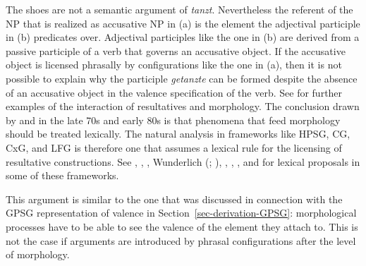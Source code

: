 \zl
The shoes are not a semantic argument of \emph{tanzt}. Nevertheless the referent of the NP that is realized as
accusative NP in (a) is the element the adjectival participle in (b) predicates
over. Adjectival participles like the one in (b) are derived from a passive participle of a
verb that governs an accusative object. If the accusative object is licensed phrasally by
configurations like the one in (a), then it is not possible to explain why the participle \emph{getanzte}
can be formed despite the absence of an accusative object in the valence specification of the verb. See  for
further examples of the interaction of resultatives and morphology.
The conclusion drawn by \citet[]{Dowty78a}
and \citet[]{Bresnan82a} in the late 70s and early 80s is that phenomena that feed morphology should be treated
lexically. The natural analysis in frameworks like HPSG, CG, CxG, and LFG is therefore one that assumes
a lexical rule for the licensing of resultative constructions. See
, , , Wunderlich (\citeyear[]{Wunderlich92a-u-kopiert}; \citeyear[--126]{Wunderlich97c}), ,
 , , and  for lexical proposals in some of
 these frameworks. 

This argument is similar to the one that was discussed in connection with the GPSG representation of
valence in Section~\ref{sec-derivation-GPSG}: morphological processes have to be able to see the valence of the element
they attach to. This is not the case if arguments are introduced by phrasal configurations after the
level of morphology.

